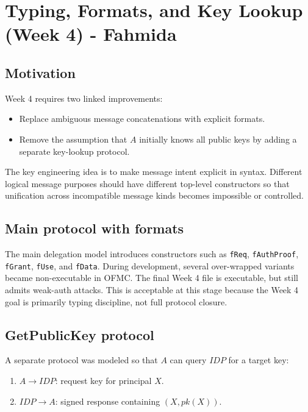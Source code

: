 \documentclass[11pt,a4paper]{article}
\begin{document}
\newpage
\section{Typing, Formats, and Key Lookup (Week 4) - Fahmida}

\subsection{Motivation}

Week 4 requires two linked improvements:
\begin{itemize}
  \item Replace ambiguous message concatenations with explicit formats.
  \item Remove the assumption that $A$ initially knows all public keys by adding a separate key-lookup protocol.
\end{itemize}

The key engineering idea is to make message intent explicit in syntax.
Different logical message purposes should have different top-level constructors
so that unification across incompatible message kinds becomes impossible or controlled.

\subsection{Main protocol with formats}

The main delegation model introduces constructors such as
\texttt{fReq}, \texttt{fAuthProof}, \texttt{fGrant}, \texttt{fUse}, and \texttt{fData}.
During development, several over-wrapped variants became non-executable in OFMC.
The final Week 4 file is executable, but still admits weak-auth attacks.
This is acceptable at this stage because the Week 4 goal is primarily typing discipline,
not full protocol closure.

\subsection{GetPublicKey protocol}

A separate protocol was modeled so that $A$ can query $\mathit{IDP}$ for a target key:
\begin{enumerate}
  \item $A \rightarrow \mathit{IDP}$: request key for principal $X$.
  \item $\mathit{IDP} \rightarrow A$: signed response containing $(X,pk(X))$.
\end{enumerate}
\end{document}
